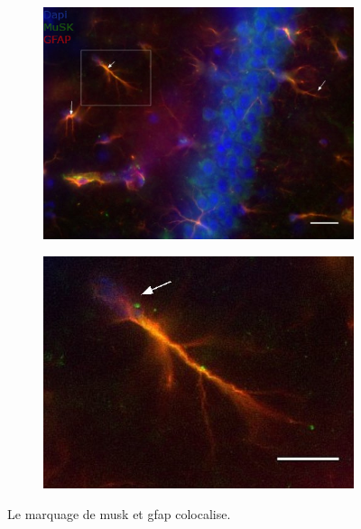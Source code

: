 \begin{figure}[h]
\begin{center}
\begin{subfigure}[h]{0.49\textwidth}
				\caption{}
				\label{fig:ColocMuSK&GFAP}
				\includegraphics[width=\textwidth]{./Images/Immuno/Musk/MuSK-GFAP/M439_Mut_MuSK_GFAP.jpg}
			\end{subfigure}
			\begin{subfigure}[h]{0.49\textwidth}
				\caption{}
				\label{fig:ColocZoom}
				\includegraphics[width=\textwidth]{./Images/Immuno/Musk/MuSK-GFAP/zoom10um.jpg}
			\end{subfigure}
		\end{center}
		\caption{Le marquage de \gls{musk} et \gls{gfap} colocalise.}
\end{figure}
